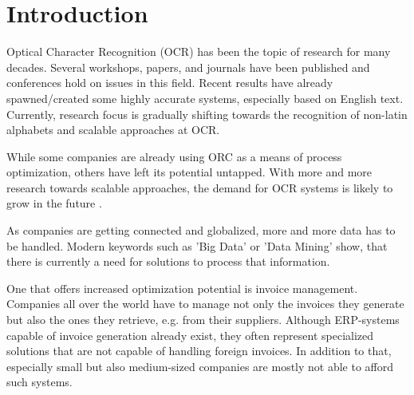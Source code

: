 %
% 

\chapter{Introduction}
\label{cha1}
Optical Character Recognition (OCR) has been the topic of research for many decades. 
Several workshops, papers, and journals have been published and conferences hold on issues in this field. %
Recent results have already spawned/created some highly accurate systems, especially based on English text. Currently, research focus is gradually shifting towards the recognition of non-latin alphabets and scalable approaches at OCR.

While some companies are already using ORC as a means of process optimization, others have left its potential untapped. With more and more research towards scalable approaches, the demand for OCR systems is likely to grow in the future \cite{Klein04}\cite{Attaran01}\cite{Billentis16}.

As companies are getting connected and globalized, more and more data has to be handled. Modern keywords such as 'Big Data' or 'Data Mining' show, that there is currently a need for solutions to process that information.

One that offers increased optimization potential is invoice management. Companies all over the world have to manage not only the invoices they generate but also the ones they retrieve, e.g. from their suppliers.
Although ERP-systems capable of invoice generation already exist, they often represent specialized solutions that are not capable of handling foreign invoices. In addition to that, especially small but also medium-sized companies are mostly not able to afford such systems. 

